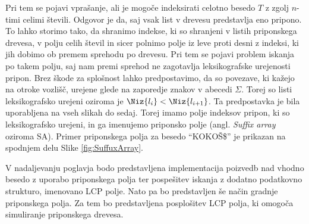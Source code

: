 Pri tem se pojavi vprašanje, ali je mogoče indeksirati celotno besedo $T$ z zgolj $n$-timi celimi števili. Odgovor je da, saj vsak list v drevesu predstavlja eno pripono. To lahko storimo tako, da shranimo indekse, ki so shranjeni v listih priponskega drevesa, v polju celih števil in sicer polnimo polje iz leve proti desni z indeksi, ki jih dobimo ob premem sprehodu po drevesu. Pri tem se pojavi problem iskanja po takem polju, saj nam premi sprehod ne zagotavlja leksikografske urejenosti pripon. Brez škode za splošnost lahko predpostavimo, da so povezave, ki kažejo na otroke vozlišč, urejene glede na zaporedje znakov v abecedi $\Sigma$. Torej so listi leksikografsko urejeni oziroma je $\Niz{l_i}<\Niz{l_{i+1}}$. Ta predpostavka je bila uporabljena na vseh slikah do sedaj. Torej imamo polje indeksov pripon, ki so leksikografsko urejeni, in ga imenujemo priponsko polje (angl. \textit{Suffix array} oziroma SA). Primer priponskega polja za besedo \enquote{KOKOŠ\$} je prikazan na spodnjem delu Slike \ref{fig:SuffuxArray}. %



V nadaljevanju poglavja bodo predstavljena implementacija poizvedb nad vhodno besedo z uporabo priponskega polja ter pospešitev iskanja z dodatno podatkovno strukturo, imenovano LCP polje. Nato pa bo predstavljen še način gradnje priponskega polja. Za tem bo predstavljena posplošitev LCP polja, ki omogoča simuliranje priponskega drevesa. 




